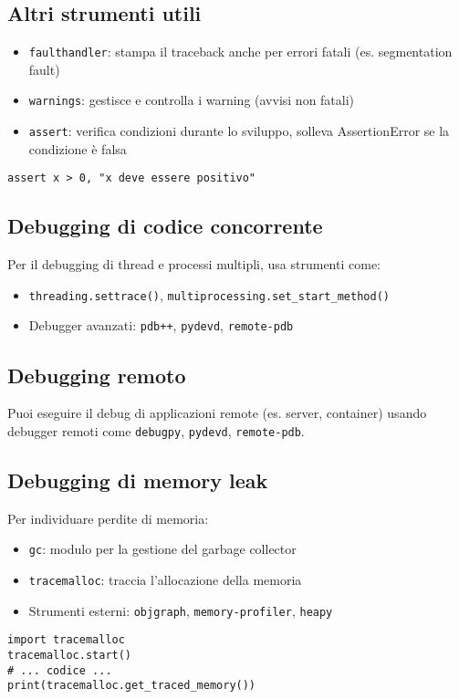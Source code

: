 \documentclass[a4paper,12pt]{article}
\begin{document}
\subsection*{Altri strumenti utili}
\begin{itemize}
    \item \texttt{faulthandler}: stampa il traceback anche per errori fatali (es. segmentation fault)
    \item \texttt{warnings}: gestisce e controlla i warning (avvisi non fatali)
    \item \texttt{assert}: verifica condizioni durante lo sviluppo, solleva AssertionError se la condizione è falsa
\end{itemize}
\begin{lstlisting}
assert x > 0, "x deve essere positivo"
\end{lstlisting}

\subsection*{Debugging di codice concorrente}
Per il debugging di thread e processi multipli, usa strumenti come:
\begin{itemize}
    \item \texttt{threading.settrace()}, \texttt{multiprocessing.set\_start\_method()}
    \item Debugger avanzati: \texttt{pdb++}, \texttt{pydevd}, \texttt{remote-pdb}
\end{itemize}

\subsection*{Debugging remoto}
Puoi eseguire il debug di applicazioni remote (es. server, container) usando debugger remoti come \texttt{debugpy}, \texttt{pydevd}, \texttt{remote-pdb}.

\subsection*{Debugging di memory leak}
Per individuare perdite di memoria:
\begin{itemize}
    \item \texttt{gc}: modulo per la gestione del garbage collector
    \item \texttt{tracemalloc}: traccia l'allocazione della memoria
    \item Strumenti esterni: \texttt{objgraph}, \texttt{memory-profiler}, \texttt{heapy}
\end{itemize}
\begin{lstlisting}
import tracemalloc
tracemalloc.start()
# ... codice ...
print(tracemalloc.get_traced_memory())
\end{lstlisting}
\end{document}
